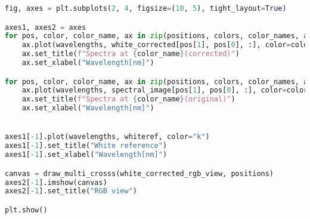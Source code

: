 \begin{lstlisting}[language=python, caption=White correction for SpecimIQ with large reference, label={code:wc-specimiq-large}]
fig, axes = plt.subplots(2, 4, figsize=(10, 5), tight_layout=True)

axes1, axes2 = axes
for pos, color, color_name, ax in zip(positions, colors, color_names, axes2):
    ax.plot(wavelengths, white_corrected[pos[1], pos[0], :], color=color)
    ax.set_title(f"Spectra at {color_name}(corrected)")
    ax.set_xlabel("Wavelength[nm]")

for pos, color, color_name, ax in zip(positions, colors, color_names, axes1):
    ax.plot(wavelengths, spectral_image[pos[1], pos[0], :], color=color)
    ax.set_title(f"Spectra at {color_name}(original)")
    ax.set_xlabel("Wavelength[nm]")


axes1[-1].plot(wavelengths, whiteref, color="k")
axes1[-1].set_title("White reference")
axes1[-1].set_xlabel("Wavelength[nm]")

canvas = draw_multi_crosss(white_corrected_rgb_view, positions)
axes2[-1].imshow(canvas)
axes2[-1].set_title("RGB view")

plt.show()

\end{lstlisting}